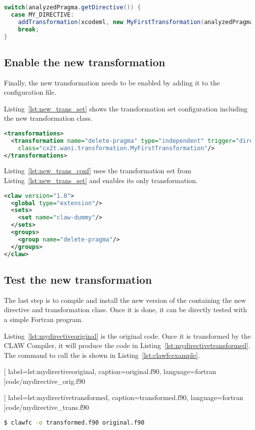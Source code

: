\begin{lstlisting}[label=lst:categorization, caption=ClawTranslator.java,
  language=java]
switch(analyzedPragma.getDirective()) {
  case MY_DIRECTIVE:
    addTransformation(xcodeml, new MyFirstTransformation(analyzedPragma));
    break;
}
\end{lstlisting}


\subsection{Enable the new transformation}
Finally, the new transformation needs to be enabled by adding it to the
configuration file.

Listing~\ref{lst:new_trans_set} shows the transformation set configuration
including the new transformation class.


\begin{lstlisting}[label=lst:new_trans_set, caption=claw-dummy-set.xml, language=xml]
<transformations>
  <transformation name="delete-pragma" type="independent" trigger="directive"
    class="cx2t.wani.transformation.MyFirstTransformation"/>
</transformations>
\end{lstlisting}

Listing~\ref{lst:new_trans_conf} uses the transformation set from
Listing~\ref{lst:new_trans_set} and enables its only transformation.

\begin{lstlisting}[label=lst:new_trans_conf, caption=claw-dummy.xml, language=xml]
<claw version="1.0">
  <global type="extension"/>
  <sets>
    <set name="claw-dummy"/>
  </sets>
  <groups>
    <group name="delete-pragma"/>
  </groups>
</claw>
\end{lstlisting}

\subsection{Test the new transformation}
The last step is to compile and install the new version of the \clawfcomp
containing the new directive and transformation class. Once it is done, it
can be directly tested with a simple Fortran program.

Listing~\ref{lst:mydirectiveoriginal} is the original code. Once it is
transformed by the CLAW Compiler, it will produce the code
in Listing~\ref{lst:mydirectivetransformed}. The command to call
the \clawfcomp is shown in Listing~\ref{lst:clawfcexample}.


  [
    label=lst:mydirectiveoriginal,
    caption=original.f90,
    language=fortran
  ]{code/mydirective_orig.f90}


  [
    label=lst:mydirectivetransformed,
    caption=transformed.f90,
    language=fortran
  ]{code/mydirective_trans.f90}

\begin{lstlisting}[label=lst:clawfcexample, caption=Call the compiler, language=bash]
$ clawfc -o transformed.f90 original.f90
\end{lstlisting}
